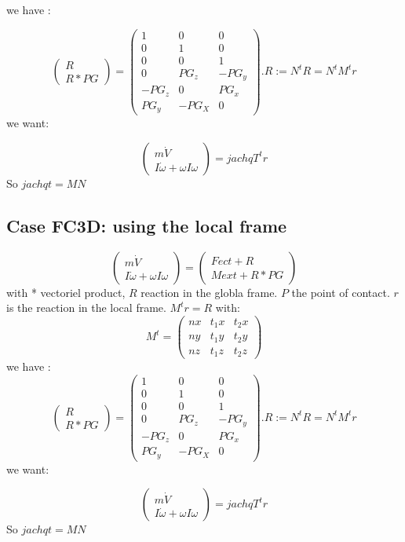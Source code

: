   we have :
  
  \[\left(\begin{array}{c}R\\R*PG\end{array}\right)=\left(\begin{array}{ccc} 1&0&0\\0&1&0\\0&0&1\\
      0&PG_z&-PG_y\\-PG_z&0&PG_x\\PG_y&-PG_X&0\end{array}\right).R:=N^tR=N^tM^tr\]
      we want:
      
\[\left(\begin{array}{c}m \dot V\\I \dot \omega + \omega I \omega \end{array}\right)=jachqT^t r\]
So $jachqt=MN$

\subsection{Case FC3D: using the local frame}

\[\left(\begin{array}{c}m \dot V\\I \dot \omega + \omega I \omega \end{array}\right)= \left(\begin{array}{c}Fect+R\\Mext + R*PG \end{array}\right)\]
  with * vectoriel product, $R$ reaction in the globla frame. $P$ the point of contact.
  $r$ is the reaction in the local frame.  $M^t r=R$ with:
  \[M^t=\left(\begin{array}{ccc} nx&t_1x&t_2x \\ny&t_1y&t_2y\\nz&t_1z&t_2z \end{array}\right)\]
  we have :
  \[\left(\begin{array}{c}R\\R*PG\end{array}\right)=\left(\begin{array}{ccc} 1&0&0\\0&1&0\\0&0&1\\
      0&PG_z&-PG_y\\-PG_z&0&PG_x\\PG_y&-PG_X&0\end{array}\right).R:=N^tR=N^tM^tr\]
      we want:
      
\[\left(\begin{array}{c}m \dot V\\I \dot \omega + \omega I \omega \end{array}\right)=jachqT^t r\]
So $jachqt=MN$
